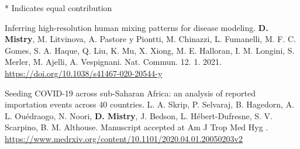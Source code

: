 
* Indicates equal contribution



\begin{cventries}


  \cvpublicationentrytwo
    {Inferring high-resolution human mixing patterns for disease modeling.} %
    {\textbf{D. Mistry}, M. Litvinova, A. Pastore y Piontti, M. Chinazzi, L. Fumanelli, M. F. C. Gomes, S. A. Haque, Q. Liu, K. Mu, X. Xiong, M. E. Halloran, I. M. Longini, S. Merler, M. Ajelli, A. Vespignani.} %
    {Nat. Commun.} %
    {12.} %
    {1.} %
    {\hspace{-1mm}} %
    {2021.} %
    {} %
    {\href{https://doi.org/10.1038/s41467-020-20544-y}{https://doi.org/10.1038/s41467-020-20544-y \faLink\acvHeaderIconSep}} %
    \vspace{1.5mm}

  \cvpublicationentrytwo
    {Seeding COVID-19 across sub-Saharan Africa: an analysis of reported importation events across 40 countries.} %
    {L. A. Skrip, P. Selvaraj, B. Hagedorn, A. L. Ouédraogo, N. Noori, \textbf{D. Mistry}, J. Bedson, L. Hébert-Dufresne, S. V. Scarpino, B. M. Althouse.} %
    {} %
    {} %
    {} %
    {} %
    {} %
    {Manuscript accepted at Am J Trop Med Hyg
    .} %
    {\href{https://www.medrxiv.org/content/10.1101/2020.04.01.20050203v2}{https://www.medrxiv.org/content/10.1101/2020.04.01.20050203v2 \faLink\acvHeaderIconSep}} %
    \vspace{1.5mm}


\end{cventries}
